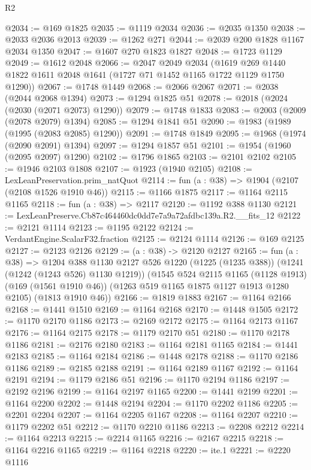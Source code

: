 \begin{lexlean}{R2}
\begin{coremodule}
@2034 := @169 @1825
@2035 := @1119 @2034
@2036 := @2035 @1350
@2038 := @2033 @2036 @2013
@2039 := @1262 @271
@2044 := @2039 @200 @1828 @1167 @2034 @1350
@2047 := @1607 @270 @1823 @1827
@2048 := @1723 @1129
@2049 := @1612 @2048
@2066 := @2047
    @2049
    @2034
    (@1619 @269 @1440 @1822 @1611 @2048 @1641 (@1727 @71 @1452 @1165 @1722 @1129 @1750 @1290))
@2067 := @1748 @1449
@2068 := @2066 @2067
@2071 := @2038 (@2044 @2068 @1394)
@2073 := @1294 @1825 @51
@2078 := @2018 (@2024 (@2030 (@2071 @2073) @1290))
@2079 := @1748 @1833
@2083 := @2003 (@2009 (@2078 @2079) @1394)
@2085 := @1294 @1841 @51
@2090 := @1983 (@1989 (@1995 (@2083 @2085) @1290))
@2091 := @1748 @1849
@2095 := @1968 (@1974 (@2090 @2091) @1394)
@2097 := @1294 @1857 @51
@2101 := @1954 (@1960 (@2095 @2097) @1290)
@2102 := @1796 @1865
@2103 := @2101 @2102
@2105 := @1946 @2103 @1808
@2107 := @1923 (@1940 @2105)
@2108 := LexLeanPreservation.prim_natQuot
@2114 := fun (a : @38) => @1904 (@2107 (@2108 @1526 @1910 @46))
@2115 := @1166 @1875
@2117 := @1164 @2115 @1165
@2118 := fun (a : @38) => @2117
@2120 := @1192 @388 @1130
@2121 := LexLeanPreserve.Cb87c464460dc0dd7e7a9a72afdbc139a.R2.__fits_12
@2122 := @2121 @1114
@2123 := @1195 @2122
@2124 := VerdantEngine.ScalarF32.fraction
@2125 := @2124 @1114
@2126 := @169 @2125
@2127 := @2123 @2126
@2129 := (a : @38) -> @2120 @2127
@2165 := fun (a : @38) =>
  @1204
    @388
    @1130
    @2127
    @526
    @1220
    (@1225 (@1235 @388))
    (@1241 (@1242 (@1243 @526) @1130 @1219))
    (@1545
      @524
      @2115
      @1165
      (@1128 @1913)
      (@169 (@1561 @1910 @46))
      (@1263 @519 @1165 @1875 @1127 @1913 @1280 @2105)
      (@1813 @1910 @46))
@2166 := @1819 @1883
@2167 := @1164 @2166
@2168 := @1441 @1510
@2169 := @1164 @2168
@2170 := @1448 @1505
@2172 := @1170 @2170 @1186
@2173 := @2169 @2172
@2175 := @1164 @2173 @1167
@2176 := @1164 @2175
@2178 := @1179 @2170 @51
@2180 := @1170 @2178 @1186
@2181 := @2176 @2180
@2183 := @1164 @2181 @1165
@2184 := @1441 @2183
@2185 := @1164 @2184
@2186 := @1448 @2178
@2188 := @1170 @2186 @1186
@2189 := @2185 @2188
@2191 := @1164 @2189 @1167
@2192 := @1164 @2191
@2194 := @1179 @2186 @51
@2196 := @1170 @2194 @1186
@2197 := @2192 @2196
@2199 := @1164 @2197 @1165
@2200 := @1441 @2199
@2201 := @1164 @2200
@2202 := @1448 @2194
@2204 := @1170 @2202 @1186
@2205 := @2201 @2204
@2207 := @1164 @2205 @1167
@2208 := @1164 @2207
@2210 := @1179 @2202 @51
@2212 := @1170 @2210 @1186
@2213 := @2208 @2212
@2214 := @1164 @2213
@2215 := @2214 @1165
@2216 := @2167 @2215
@2218 := @1164 @2216 @1165
@2219 := @1164 @2218
@2220 := ite.{1}
@2221 := @2220 @1116

\end{coremodule}
\end{lexlean}
